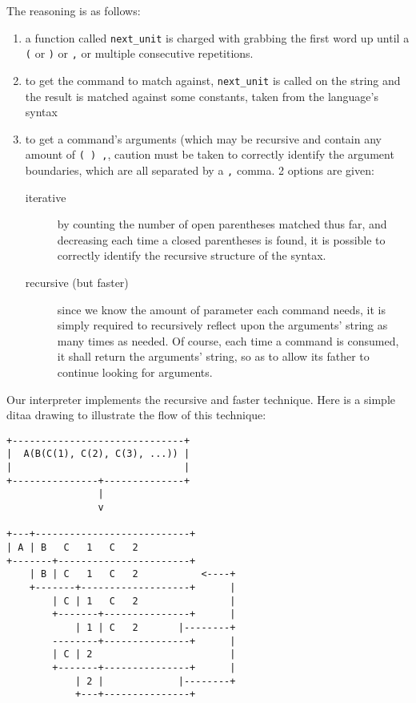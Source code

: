 \documentclass[11pt]{report}
\begin{document}
The reasoning is as follows:
\begin{enumerate}
\item a function called \texttt{next\_unit} is charged with grabbing the first word up until a \texttt{(} or \texttt{)} or \texttt{,} or multiple consecutive repetitions.
\item to get the command to match against, \texttt{next\_unit} is called on the string and the result is matched against some constants, taken from the language's syntax
\item to get a command's arguments (which may be recursive and contain any amount of \texttt{( ) ,}, caution must be taken to correctly identify the argument boundaries, which are all separated by a \texttt{,} comma. 2 options are given:
\begin{description}
\item[{iterative}] by counting the number of open parentheses matched thus far, and decreasing each time a closed parentheses is found,
it is possible to correctly identify the recursive structure of the syntax.
\item[{recursive (but faster)}] since we know the amount of parameter each command needs, it is
simply required to recursively reflect upon the arguments' string as many times as needed.
Of course, each time a command is consumed, it shall return the arguments' string, so as to allow its father to continue
looking for arguments.
\end{description}
\end{enumerate}

Our interpreter implements the recursive and faster technique. Here is a simple ditaa drawing to illustrate
the flow of this technique:

\begin{verbatim}
+------------------------------+
|  A(B(C(1), C(2), C(3), ...)) |
|                              |
+---------------+--------------+
                |
                v

+---+---------------------------+
| A | B   C   1   C   2
+-------+-----------------------+
    | B | C   1   C   2           <----+
    +-------+-------------------+      |
        | C | 1   C   2                |
        +-------+---------------+      |
            | 1 | C   2       |--------+
        --------+---------------+      |
        | C | 2                        |
        +-------+---------------+      |
            | 2 |             |--------+
            +---+---------------+
\end{verbatim}
\end{document}
